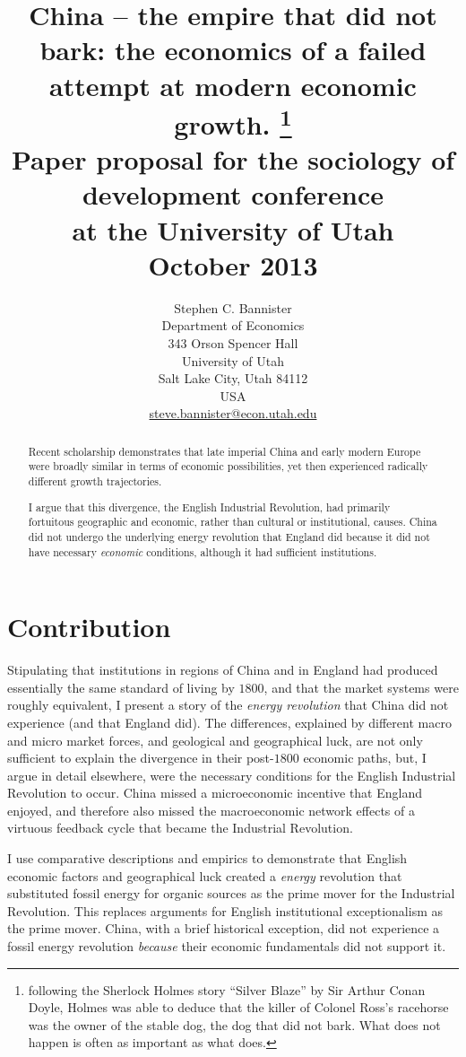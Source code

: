 \documentclass[12pt]{article}
\title{China -- the empire that did not bark: the economics of a failed attempt at modern economic growth. \footnote{following the Sherlock Holmes story ``Silver Blaze'' by Sir Arthur Conan Doyle, Holmes was able to deduce that the killer of Colonel Ross's racehorse was the owner of the stable dog, the dog that did not bark. What does not happen is often as important as what does.}\\ Paper proposal for the sociology of development conference\\at the University of Utah\\October 2013 \\
}
\author{Stephen C. Bannister\\
	Department of Economics\\
	343 Orson Spencer Hall\\
	University of Utah\\
	Salt Lake City, Utah 84112\\
	USA\\
	\href{mailto:steve.bannister@econ.utah.edu}{steve.bannister@econ.utah.edu}\\
	}
\date{}
\numberwithin{equation}{section}
\begin{document}

\graphicspath{{../images/}}

%
	\maketitle

\newpage
	\begin{abstract}
	Recent scholarship demonstrates that late imperial China and early modern Europe were broadly similar in terms of economic possibilities, yet then experienced radically different growth trajectories.
	
	I argue that this divergence, the English Industrial Revolution, had primarily fortuitous geographic and economic, rather than cultural or institutional, causes. China did not undergo the underlying energy revolution that England did because it did not have necessary \textit{economic} conditions, although it had sufficient institutions.
	\end{abstract}
	
	\section*{Contribution}
	Stipulating that institutions in regions of China and in England had produced essentially the same standard of living by $1800$, and that the market systems were roughly equivalent, I present a story of the \textit{energy revolution} that China did not experience (and that England did). The differences, explained by different macro and micro market forces, and geological and geographical luck, are not only sufficient to explain the divergence in their post-$1800$ economic paths, but, I argue in detail elsewhere, were the necessary conditions for the English Industrial Revolution to occur. China missed a microeconomic incentive that England enjoyed, and therefore also missed the macroeconomic network effects of a virtuous feedback cycle that became the Industrial Revolution. 
	
	I use comparative descriptions and empirics to demonstrate that English economic factors and geographical luck created a \textit{energy} revolution that substituted fossil energy for organic sources as the prime mover for the Industrial Revolution. This replaces arguments for English institutional exceptionalism as the prime mover. China, with a brief historical exception, did not experience a fossil energy revolution \textit{because} their economic fundamentals did not support it.
	
\end{document}
